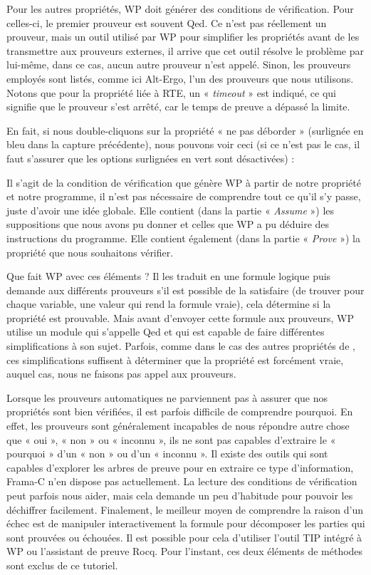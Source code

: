 Pour les autres propriétés, WP doit générer des conditions de vérification. Pour
celles-ci, le premier prouveur est souvent Qed. Ce n'est pas réellement un
prouveur, mais un outil utilisé par WP pour simplifier les propriétés avant de
les transmettre aux prouveurs externes, il arrive que cet outil résolve
le problème par lui-même, dans ce cas, aucun autre prouveur
n'est appelé. Sinon, les prouveurs employés sont listés, comme ici Alt-Ergo,
l'un des prouveurs que nous utilisons. Notons que pour la
propriété liée à RTE, un « \textit{timeout} » est indiqué, ce qui signifie que le
prouveur s'est arrêté, car le temps de preuve a dépassé la limite.


En fait, si nous double-cliquons sur la
propriété « ne pas déborder » (surlignée en bleu dans la capture précédente),
nous pouvons voir ceci (si ce n'est pas le cas, il faut s'assurer que
les options surlignées en vert sont désactivées) :





Il s'agit de la condition de vérification que génère WP à partir de notre propriété et
notre programme, il n'est pas nécessaire de comprendre tout ce qu'il s'y passe,
juste d'avoir une idée globale. Elle contient (dans la partie « \textit{Assume} ») les
suppositions que nous avons pu donner et celles que WP a pu déduire des
instructions du programme. Elle contient également (dans la partie « \textit{Prove} »)
la propriété que nous souhaitons vérifier.



Que fait WP avec ces éléments ? Il les traduit en une formule
logique puis demande aux différents prouveurs s'il est possible de la
satisfaire (de trouver pour chaque variable, une valeur qui rend la formule
vraie), cela détermine si la propriété est prouvable. Mais avant d'envoyer
cette formule aux prouveurs, WP utilise un module qui s'appelle Qed et qui est
capable de faire différentes simplifications à son sujet. Parfois, comme dans
le cas des autres propriétés de , ces simplifications suffisent à
déterminer que la propriété est forcément vraie, auquel cas, nous ne faisons
pas appel aux prouveurs.



Lorsque les prouveurs automatiques ne parviennent pas à assurer que nos
propriétés sont bien vérifiées, il est parfois difficile de comprendre
pourquoi. En effet, les prouveurs sont généralement incapables de nous
répondre autre chose que « oui », « non » ou « inconnu », ils ne sont pas
capables d'extraire le « pourquoi » d'un « non » ou d'un « inconnu ». Il
existe des outils qui
sont capables d'explorer les arbres de preuve pour en extraire ce type
d'information, Frama-C n'en dispose pas actuellement. La lecture des
conditions de vérification peut parfois nous aider, mais cela demande un peu
d'habitude pour pouvoir les déchiffrer facilement. Finalement, le meilleur
moyen de comprendre la raison d'un échec est de manipuler interactivement la
formule pour décomposer les parties qui sont prouvées ou échouées. Il est
possible pour cela d'utiliser l'outil TIP intégré à WP ou l'assistant de preuve
Rocq. Pour l'instant, ces deux éléments de méthodes sont exclus de ce tutoriel.



